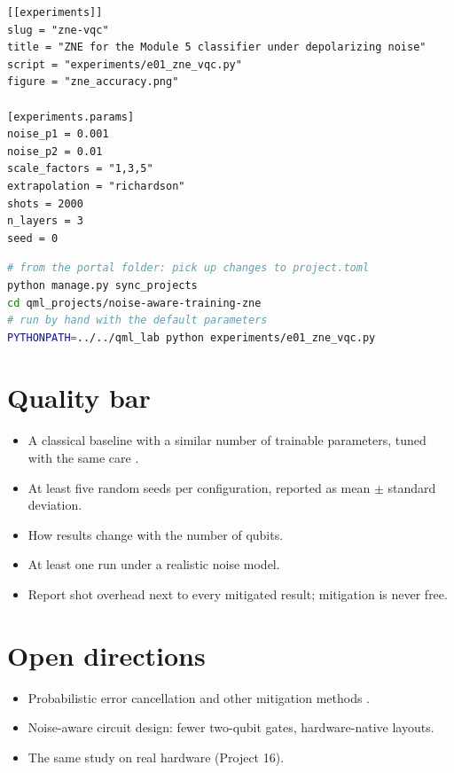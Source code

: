 \documentclass[11pt,a4paper]{article}
\begin{document}
\begin{lstlisting}[language={}]
[[experiments]]
slug = "zne-vqc"
title = "ZNE for the Module 5 classifier under depolarizing noise"
script = "experiments/e01_zne_vqc.py"
figure = "zne_accuracy.png"

[experiments.params]
noise_p1 = 0.001
noise_p2 = 0.01
scale_factors = "1,3,5"
extrapolation = "richardson"
shots = 2000
n_layers = 3
seed = 0
\end{lstlisting}

\begin{lstlisting}[language=bash]
# from the portal folder: pick up changes to project.toml
python manage.py sync_projects
cd qml_projects/noise-aware-training-zne
# run by hand with the default parameters
PYTHONPATH=../../qml_lab python experiments/e01_zne_vqc.py
\end{lstlisting}

\section{Quality bar}
\begin{itemize}
  \item A classical baseline with a similar number of trainable parameters, tuned with the same care \citep{bowles2024}.
  \item At least five random seeds per configuration, reported as mean $\pm$ standard deviation.
  \item How results change with the number of qubits.
  \item At least one run under a realistic noise model.
  \item Report shot overhead next to every mitigated result; mitigation is never free.
\end{itemize}

\section{Open directions}
\begin{itemize}
  \item Probabilistic error cancellation and other mitigation methods \citep{cai2023}.
  \item Noise-aware circuit design: fewer two-qubit gates, hardware-native layouts.
  \item The same study on real hardware (Project 16).
\end{itemize}
\end{document}
